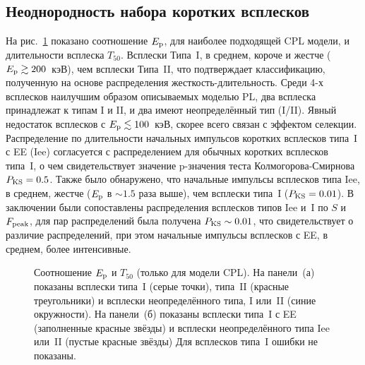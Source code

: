\subsection{Неоднородность набора коротких всплесков}
На рис.~\ref{fig:EpT50} показано соотношение $E_{\mathrm{p}}$, для наиболее подходящей CPL модели,
и длительности всплеска $T_{50}$. Всплески Типа~I, в среднем, короче и жестче 
($E_{\mathrm{p}}\gtrsim 200$~кэВ), чем всплески Типа~II, что подтверждает классификацию,
полученную на основе распределения жесткость-длительность.
Среди 4-х всплесков наилучшим образом описываемых моделью PL, два всплеска принадлежат к типам I и II,
и два имеют неопределённый тип (I/II). Явный недостаток всплесков с $E_{\mathrm{p}}\lesssim 100$~кэВ,
скорее всего связан с эффектом селекции. 
Распределение по длительности начальных импульсов коротких всплесков типа~I с EE (Iee) согласуется с 
распределением для обычных коротких всплесков типа~I, о чем свидетельствует значение p-значения
теста Колмогорова-Смирнова $P_{\mathrm{KS}}=0.5$. Также было обнаружено, что
начальные импульсы всплесков типа Iee, в среднем, жестче ($E_{\mathrm{p}}$ в $\sim 1.5$ раза выше),
чем всплески типа~I ($P_{\mathrm{KS}} = 0.01$). В заключении были сопоставлены распределения 
всплесков типов Iee и~I по $S$ и $F_{\mathrm{peak}}$, для пар распределений 
была получена $P_{\mathrm{KS}} \sim 0.01$, что свидетельствует о различие распределений,
при этом начальные импульсы всплесков с EE, в среднем, более интенсивные.

\begin{figure}
    \begin{minipage}[h]{0.5\textwidth}
    \end{minipage}
    \hfill
    \begin{minipage}[h]{0.5\textwidth}
	\end{minipage}

\caption{
    Соотношение $E_{\mathrm{p}}$ и $T_{50}$ (только для модели CPL).
    На панели~(а) показаны всплески типа~I (серые точки), типа~II (красные треугольники)
    и всплески неопределённого типа, I или~II (синие окружности).
    На панели~(б) показаны всплески типа~I с EE (заполненные красные звёзды)
    и всплески неопределённого типа Iee или~II (пустые красные звёзды)
    Для всплесков типа~I ошибки не показаны. 
    \label{fig:EpT50}}
\end{figure}

